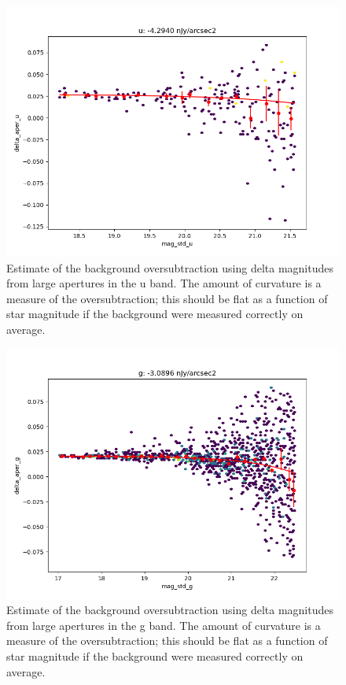 \begin{figure}
  \includegraphics{photometric_calibration_figures/background_oversubtraction_u.png}
  \caption{Estimate of the background oversubtraction using delta magnitudes
    from large apertures in the u band.  The amount of curvature is a measure
    of the oversubtraction; this should be flat as a function of star magnitude
    if the background were measured correctly on average.}
\end{figure}

\begin{figure}
  \includegraphics{photometric_calibration_figures/background_oversubtraction_g.png}
  \caption{Estimate of the background oversubtraction using delta magnitudes
    from large apertures in the g band.  The amount of curvature is a measure
    of the oversubtraction; this should be flat as a function of star magnitude
    if the background were measured correctly on average.}
\end{figure}

